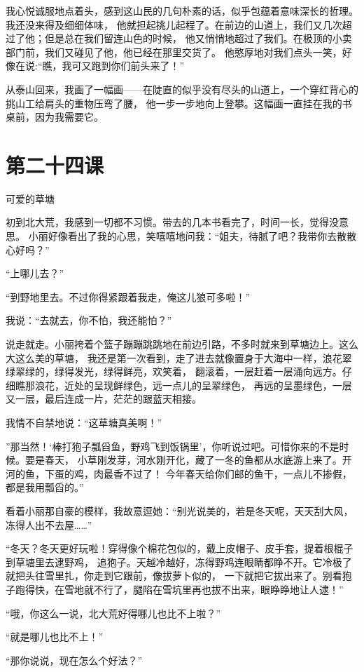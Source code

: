 \documentclass[12pt,UTF8]{ctexbook}
\begin{document}
我心悦诚服地点着头，感到这山民的几句朴素的话，似乎包蕴着意味深长的哲理。我还没来得及细细体味，
他就担起挑儿起程了。在前边的山道上，我们又几次超过了他；但是总在我们留连山色的时候，
他又悄悄地超过了我们。在极顶的小卖部门前，我们又碰见了他，他已经在那里交货了。
他憨厚地对我们点头一笑，好像在说:“瞧，我可又跑到你们前头来了！”

从泰山回来，我画了一幅画——在陡直的似乎没有尽头的山道上，一个穿红背心的挑山工给肩头的重物压弯了腰，
他一步一步地向上登攀。这幅画一直挂在我的书桌前，因为我需要它。

\section{第二十四课}

可爱的草塘

初到北大荒，我感到一切都不习惯。带去的几本书看完了，时间一长，觉得没意思。
小丽好像看出了我的心思，笑嘻嘻地问我：“姐夫，待腻了吧？我带你去散散心好吗？”

“上哪儿去？”

“到野地里去。不过你得紧跟着我走，俺这儿狼可多啦！”

我说：“去就去，你不怕，我还能怕？”

说走就走。小丽挎着个篮子蹦蹦跳跳地在前边引路，不多时就来到草塘边上。这么大这么美的草塘，
我还是第一次看到，走了进去就像置身于大海中一样，浪花翠绿翠绿的，绿得发光，绿得鲜亮，欢笑着，
翻滚着，一层赶着一层涌向远方。仔细瞧那浪花，近处的呈现鲜绿色，远一点儿的呈翠绿色，
再远的呈墨绿色，一层又一层，最后连成一片，茫茫的跟蓝天相接。

我情不自禁地说：“这草塘真美啊！”

”那当然！‘棒打狍子瓢舀鱼，野鸡飞到饭锅里’，你听说过吧。可惜你来的不是时候。要是春天，
小草刚发芽，河水刚开化，藏了一冬的鱼都从水底游上来了。开河的鱼，下蛋的鸡，肉最香不过了！
今年春天给你们邮的鱼干，一点儿不掺假，都是我用瓢舀的。”

看着小丽那自豪的模样，我故意逗她：“别光说美的，若是冬天呢，天天刮大风，冻得人出不去屋……”

“冬天？冬天更好玩啦！穿得像个棉花包似的，戴上皮帽子、皮手套，提着根棍子到草塘里去逮野鸡，
追狍子。天越冷越好，冻得野鸡连眼睛都睁不开。它冷极了就把头往雪里扎，你走到它跟前，像拔萝卜似的，
一下就把它拔出来了。别看狍子跑得快，在雪地就不行了，腿陷在雪坑里再也拔不出来，眼睁睁地让人逮！”

“哦，你这么一说，北大荒好得哪儿也比不上啦？”

“就是哪儿也比不上！”

“那你说说，现在怎么个好法？”
\end{document}
